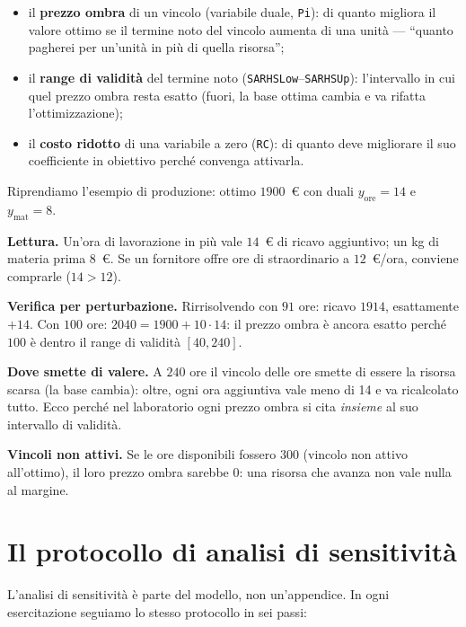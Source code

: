 \begin{itemize}
  \item il \textbf{prezzo ombra} di un vincolo (variabile duale, \texttt{Pi}):
        di quanto migliora il valore ottimo se il termine noto del vincolo aumenta di
        una unità --- ``quanto pagherei per un'unità in più di quella risorsa'';
  \item il \textbf{range di validità} del termine noto
        (\texttt{SARHSLow}--\texttt{SARHSUp}): l'intervallo in cui quel prezzo ombra
        resta esatto (fuori, la base ottima cambia e va rifatta l'ottimizzazione);
  \item il \textbf{costo ridotto} di una variabile a zero (\texttt{RC}): di quanto
        deve migliorare il suo coefficiente in obiettivo perché convenga attivarla.
\end{itemize}

\begin{esempio}
Riprendiamo l'esempio di produzione: ottimo $1900$~\euro{} con duali
$y_{\text{ore}} = 14$ e $y_{\text{mat}} = 8$.

\textbf{Lettura.} Un'ora di lavorazione in più vale $14$~\euro{} di ricavo aggiuntivo;
un kg di materia prima $8$~\euro. Se un fornitore offre ore di straordinario a
$12$~\euro/ora, conviene comprarle ($14 > 12$).

\textbf{Verifica per perturbazione.} Rirrisolvendo con $91$ ore: ricavo $1914$,
esattamente $+14$. Con $100$ ore: $2040 = 1900 + 10 \cdot 14$: il prezzo ombra è
ancora esatto perché $100$ è dentro il range di validità $[40, 240]$.

\textbf{Dove smette di valere.} A $240$ ore il vincolo delle ore smette di essere
la risorsa scarsa (la base cambia): oltre, ogni ora aggiuntiva vale meno di 14 e va
ricalcolato tutto. Ecco perché nel laboratorio ogni prezzo ombra si cita
\emph{insieme} al suo intervallo di validità.

\textbf{Vincoli non attivi.} Se le ore disponibili fossero $300$ (vincolo non
attivo all'ottimo), il loro prezzo ombra sarebbe $0$: una risorsa che avanza non
vale nulla al margine.
\end{esempio}

\section{Il protocollo di analisi di sensitività}
\label{sec:protocollo}

L'analisi di sensitività è parte del modello, non un'appendice. In ogni esercitazione
seguiamo lo stesso protocollo in sei passi:

